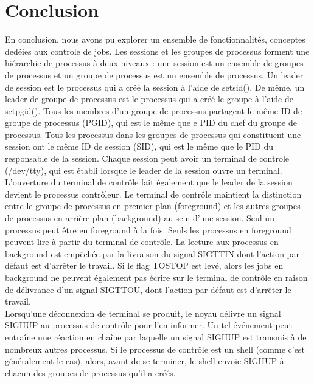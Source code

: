 \section{Conclusion}

En conclusion, nous avons pu explorer un ensemble de fonctionnalités, conceptes
dedéies aux controle de jobs. 
\newline
Les sessions et les groupes de processus forment une hiérarchie de processus à 
deux niveaux : une session est un ensemble de groupes de processus et un groupe 
de processus est un ensemble de processus.
\newline
Un leader de session est le processus qui a créé la session à l'aide de setsid().
De même, un leader de groupe de processus est le processus qui a créé le groupe à 
l'aide de setpgid(). Tous les membres d'un groupe de processus partagent le même ID 
de groupe de processus (PGID), qui est le même que e PID du chef du groupe de processus.
Tous les processus dans les groupes de processus qui constituent une session ont le 
même ID de session (SID), qui est le même que le PID du responsable de la session.
\newline
Chaque session peut avoir un terminal de controle (/dev/tty), qui est établi lorsque 
le leader de la session ouvre un terminal. L'ouverture du terminal de contrôle fait 
également que le leader de la session devient le processus contrôleur.
\newline
Le terminal de contrôle maintient la distinction entre le groupe de processus en premier plan (foreground) 
et les autres groupes de processus en arrière-plan (background) au sein d'une session. 
Seul un processus peut être en foreground à la fois. Seuls les processus en foreground peuvent lire à partir 
du terminal de contrôle. La lecture aux processus en background est empêchée par la livraison du signal SIGTTIN
dont l'action par défaut est d'arrêter le travail. Si le flag TOSTOP est levé, alors
les jobs en background ne peuvent également pas écrire sur le terminal de contrôle en raison de
délivrance d'un signal SIGTTOU, dont l'action par défaut est d'arrêter le travail.
\\
Lorsqu'une déconnexion de terminal se produit, le noyau délivre un signal SIGHUP au processus de contrôle pour l'en informer. 
Un tel événement peut entraîne une réaction en chaîne par laquelle un signal SIGHUP est transmis à de nombreux autres processus. 
Si le processus de contrôle est un shell (comme c'est généralement le cas), alors, avant de se terminer, le shell envoie SIGHUP à 
chacun des groupes de processus qu'il a créés. 
